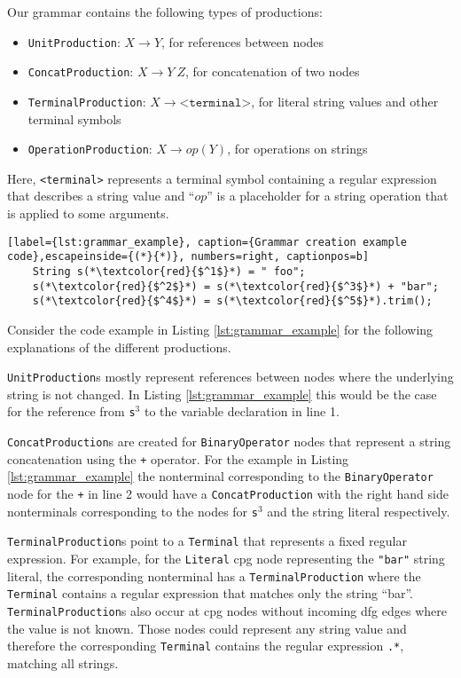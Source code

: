 Our grammar contains the following types of productions:
\begin{itemize}
	\item \lstinline|UnitProduction|:  $X \rightarrow Y$, for references between nodes
	\item \lstinline|ConcatProduction|: $X \rightarrow Y\ Z$, for concatenation of two nodes
	\item \lstinline|TerminalProduction|: $X \rightarrow \texttt{<terminal>}$, for literal string values and other terminal symbols
	\item \lstinline|OperationProduction|: $X \rightarrow op(Y)$, for operations on strings
\end{itemize}

Here, \texttt{<terminal>} represents a terminal symbol containing a regular expression that describes a string value and \enquote{$op$} is a placeholder for a string operation that is applied to some arguments.

\begin{lstlisting}[label={lst:grammar_example}, caption={Grammar creation example code},escapeinside={(*}{*)}, numbers=right, captionpos=b]
	String s(*\textcolor{red}{$^1$}*) = " foo";
	s(*\textcolor{red}{$^2$}*) = s(*\textcolor{red}{$^3$}*) + "bar";
	s(*\textcolor{red}{$^4$}*) = s(*\textcolor{red}{$^5$}*).trim();
\end{lstlisting}

Consider the code example in Listing \ref{lst:grammar_example} for the following explanations of the different productions.

\lstinline|UnitProduction|s mostly represent references between nodes where the underlying string is not changed. In Listing \ref{lst:grammar_example} this would be the case for the reference from \lstinline|s|$^3$ to the variable declaration in line 1. 

\lstinline|ConcatProduction|s are created for \lstinline|BinaryOperator| nodes that represent a string concatenation using the \lstinline|+| operator. For the example in Listing \ref{lst:grammar_example} the nonterminal corresponding to the \lstinline|BinaryOperator| node for the \lstinline|+| in line 2 would have a \lstinline|ConcatProduction| with the right hand side nonterminals corresponding to the nodes for \lstinline|s|$^3$ and the string literal respectively.

\lstinline|TerminalProduction|s point to a \lstinline|Terminal| that represents a fixed regular expression.
For example, for the \lstinline|Literal| \ac{cpg} node representing the \lstinline|"bar"| string literal, the corresponding nonterminal has a \lstinline|TerminalProduction| where the \lstinline|Terminal| contains a regular expression that matches only the string \enquote{bar}. \lstinline|TerminalProduction|s also occur at \ac{cpg} nodes without incoming \ac{dfg} edges where the value is not known. Those nodes could represent any string value and therefore the corresponding \lstinline|Terminal| contains the regular expression \lstinline|.*|, matching all strings.

